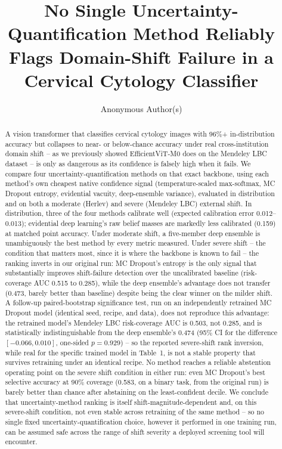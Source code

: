 \documentclass[runningheads]{llncs}
\begin{document}
\title{No Single Uncertainty-Quantification Method Reliably Flags Domain-Shift Failure in a Cervical Cytology Classifier}

\author{Anonymous Author(s)}

\maketitle

\begin{abstract}
A vision transformer that classifies cervical cytology images with 96\%+
in-distribution accuracy but collapses to near- or below-chance accuracy
under real cross-institution domain shift -- as we previously showed
EfficientViT-M0 does on the Mendeley LBC dataset -- is only as dangerous as
its confidence is falsely high when it fails. We compare four
uncertainty-quantification methods on that exact backbone, using each
method's own cheapest native confidence signal (temperature-scaled
max-softmax, MC Dropout entropy, evidential vacuity, deep-ensemble
variance), evaluated in distribution and on both a moderate (Herlev) and
severe (Mendeley LBC) external shift. In distribution, three of the four
methods calibrate well (expected calibration error 0.012--0.013);
evidential deep learning's raw belief masses are markedly less calibrated
(0.159) at matched point accuracy. Under moderate shift, a five-member
deep ensemble is unambiguously the best method by every metric measured.
Under severe shift -- the condition that matters most, since it is where
the backbone is known to fail -- the ranking inverts in our original run:
MC Dropout's entropy is the only signal that substantially improves
shift-failure detection over the uncalibrated baseline (risk-coverage AUC
0.515 to 0.285), while the deep ensemble's advantage does not transfer
(0.473, barely better than baseline) despite being the clear winner on the
milder shift. A follow-up paired-bootstrap significance test, run on an
independently retrained MC Dropout model (identical seed, recipe, and
data), does not reproduce this advantage: the retrained model's Mendeley
LBC risk-coverage AUC is 0.503, not 0.285, and is statistically
indistinguishable from the deep ensemble's 0.474 (95\% CI for the
difference $[-0.066, 0.010]$, one-sided $p=0.929$) -- so the reported
severe-shift rank inversion, while real for the specific trained model in
Table~1, is not a stable property that survives retraining under an
identical recipe. No method reaches a reliable abstention operating point
on the severe shift condition in either run: even MC Dropout's best
selective accuracy at 90\% coverage (0.583, on a binary task, from the
original run) is barely better than chance after abstaining on the
least-confident decile. We conclude that uncertainty-method ranking is
itself shift-magnitude-dependent and, on this severe-shift condition, not
even stable across retraining of the same method -- so no single fixed
uncertainty-quantification choice, however it performed in one training
run, can be assumed safe across the range of shift severity a deployed
screening tool will encounter.


\end{abstract}
\end{document}
